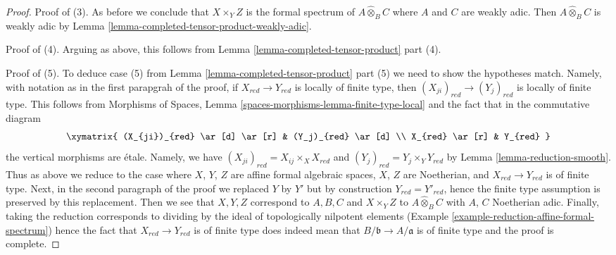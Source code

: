\begin{proof}
\medskip\noindent
Proof of (3). As before we conclude that $X \times_Y Z$ is the formal spectrum
of $A \widehat{\otimes}_B C$ where $A$ and $C$ are weakly adic.
Then $A \widehat{\otimes}_B C$ is weakly adic by 
Lemma \ref{lemma-completed-tensor-product-weakly-adic}.

\medskip\noindent
Proof of (4). Arguing as above, this follows from
Lemma \ref{lemma-completed-tensor-product} part (4).

\medskip\noindent
Proof of (5). To deduce case (5) from
Lemma \ref{lemma-completed-tensor-product} part (5)
we need to show the hypotheses match.
Namely, with notation as in the first parapgrah of the proof,
if $X_{red} \to Y_{red}$ is locally of finite type, then
$(X_{ji})_{red} \to (Y_j)_{red}$ is locally of finite type. This follows
from Morphisms of Spaces, Lemma \ref{spaces-morphisms-lemma-finite-type-local}
and the fact that in the commutative diagram
$$
\xymatrix{
(X_{ji})_{red} \ar[d] \ar[r] & (Y_j)_{red} \ar[d] \\
X_{red} \ar[r] & Y_{red}
}
$$
the vertical morphisms are \'etale. Namely, we have
$(X_{ji})_{red} = X_{ij} \times_X X_{red}$ and
$(Y_j)_{red} = Y_j \times_Y Y_{red}$
by Lemma \ref{lemma-reduction-smooth}. Thus as above we reduce
to the case where $X$, $Y$, $Z$ are affine formal algebraic spaces,
$X$, $Z$ are Noetherian, and $X_{red} \to Y_{red}$ is of finite type.
Next, in the second paragraph of the proof we replaced $Y$ by $Y'$
but by construction $Y_{red} = Y'_{red}$, hence the finite type
assumption is preserved by this replacement. Then we see that
$X, Y, Z$ correspond to $A, B, C$ and $X \times_Y Z$ to
$A \widehat{\otimes}_B C$ with $A$, $C$ Noetherian adic.
Finally, taking the reduction corresponds to dividing by the
ideal of topologically nilpotent elements
(Example \ref{example-reduction-affine-formal-spectrum})
hence the fact that $X_{red} \to Y_{red}$ is of finite type
does indeed mean that $B/\mathfrak b \to A/\mathfrak a$ is of finite type
and the proof is complete.
\end{proof}
